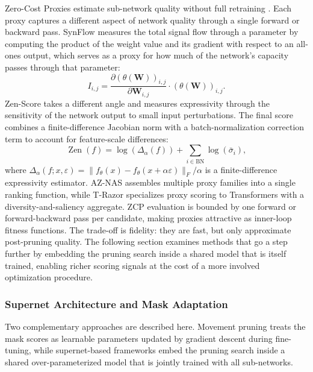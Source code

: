 Zero-Cost Proxies estimate sub-network quality without full retraining \cite{abdelfattah2021zero,li2023zeroshot}. Each proxy captures a different aspect of network quality through a single forward or backward pass. SynFlow \cite{tanaka2020pruning} measures the total signal flow through a parameter by computing the product of the weight value and its gradient with respect to an all-ones output, which serves as a proxy for how much of the network's capacity passes through that parameter:
\begin{equation}
	I_{i,j} = \frac{\partial (\theta(\mathbf{W}))_{i,j}}{\partial \mathbf{W}_{i,j}} \cdot (\theta(\mathbf{W}))_{i,j}.
\end{equation}
Zen-Score \cite{lin2021zen} takes a different angle and measures expressivity through the sensitivity of the network output to small input perturbations. The final score combines a finite-difference Jacobian norm with a batch-normalization correction term to account for feature-scale differences:
\begin{equation}
	\operatorname{Zen}(f) = \log( \Delta_\alpha(f) ) + \sum_{i\in\mathrm{BN}} \log(\bar{\sigma}_i),
\end{equation}
where $\Delta_\alpha(f; x,\varepsilon) = \|f_\theta(x) - f_\theta(x+\alpha \varepsilon)\|_F / \alpha$ is a finite-difference expressivity estimator. AZ-NAS \cite{lee2024aznasassemblingzerocostproxies} assembles multiple proxy families into a single ranking function, while T-Razor \cite{zhou2022trazor} specializes proxy scoring to Transformers with a diversity-and-saliency aggregate. ZCP evaluation is bounded by one forward or forward-backward pass per candidate, making proxies attractive as inner-loop fitness functions. The trade-off is fidelity: they are fast, but only approximate post-pruning quality. The following section examines methods that go a step further by embedding the pruning search inside a shared model that is itself trained, enabling richer scoring signals at the cost of a more involved optimization procedure.

\subsubsection{Supernet Architecture and Mask Adaptation}

Two complementary approaches are described here. Movement pruning treats the mask scores as learnable parameters updated by gradient descent during fine-tuning, while supernet-based frameworks embed the pruning search inside a shared over-parameterized model that is jointly trained with all sub-networks.

